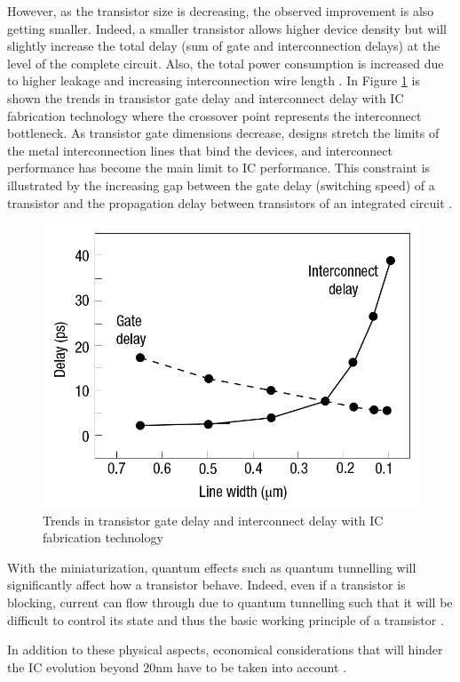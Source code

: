 However, as the transistor size is decreasing, the observed improvement is also getting smaller. Indeed, a smaller transistor allows higher device density but will slightly increase the total delay (sum of gate and interconnection delays) at the level of the complete circuit. Also, the total power consumption is increased due to higher leakage and increasing interconnection wire length \cite{5227192}. In Figure \ref{fig:delaygateinterconnect} is shown the trends in transistor gate delay and interconnect delay with IC fabrication technology where the crossover point represents the interconnect bottleneck. As transistor gate dimensions decrease, designs stretch the limits of the metal interconnection lines that bind the devices, and interconnect performance has become the main limit to IC performance. This constraint is illustrated by the increasing gap between the gate delay (switching speed) of a transistor and the propagation delay between transistors of an integrated circuit \cite{kirchain2007}.

\begin{figure}
\begin{center}
\includegraphics[width=0.7\linewidth]{delaygateinterconnect}
\end{center}
\caption{Trends in transistor gate delay and interconnect delay with IC fabrication technology \cite{kirchain2007}}
\label{fig:delaygateinterconnect}
\end{figure}

With the miniaturization, quantum effects such as quantum tunnelling will significantly affect how a transistor behave. Indeed, even if a transistor is blocking, current can flow through due to quantum tunnelling such that it will be difficult to control its state and thus the basic working principle of a transistor \cite{1240081}.

In addition to these physical aspects, economical considerations that will hinder the IC evolution beyond 20nm have to be taken into account \cite{5227192,PFF10}.

